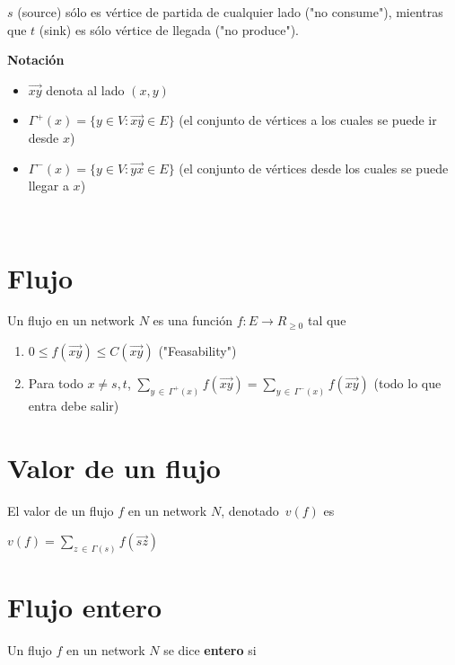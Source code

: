 \documentclass[10pt,a4paper]{article}
\begin{document}
$s$ (source) sólo es vértice de partida de cualquier lado ("no consume"), mientras que $t$ (sink) es sólo vértice de llegada ("no produce").

\textbf{Notación}

\begin{itemize}

	\item \textbf{$\overrightarrow{xy}$ }denota al lado $(x, y)$
	\item $\Gamma^+(x) = \{y \in V: \overrightarrow{xy} \in E\}$ (el conjunto de vértices a los cuales se puede ir desde $x$)
	\item $\Gamma^-(x) = \{y \in V: \overrightarrow{yx} \in E\}$ (el conjunto de vértices desde los cuales se puede llegar a $x$)
\end{itemize}

 

\section*{Flujo}

Un flujo en un network $N$ es una función $f: E \rightarrow R_{\geq 0}$ tal que

\begin{enumerate}

	\item $0 \leq f(\overrightarrow{xy})\leq C(\overrightarrow{xy})$ ("Feasability")
	\item Para todo $x \neq s, t$, $\sum\limits_{y\,\in\,\Gamma^+(x)} f(\overrightarrow{xy}) = \sum\limits_{y\,\in\,\Gamma^-(x)} f(\overrightarrow{xy})$ (todo lo que entra debe salir)
\end{enumerate}

\section*{Valor de un flujo}

El valor de un flujo $f$ en un network $N$, denotado $v(f)$ es

\begin{center}
$v(f) = \sum\limits_{z\,\in\,\Gamma(s)}f(\overrightarrow{sz})$
\end{center}

\section*{Flujo entero}

Un flujo $f$ en un network $N$ se dice \textbf{entero} si
\end{document}

